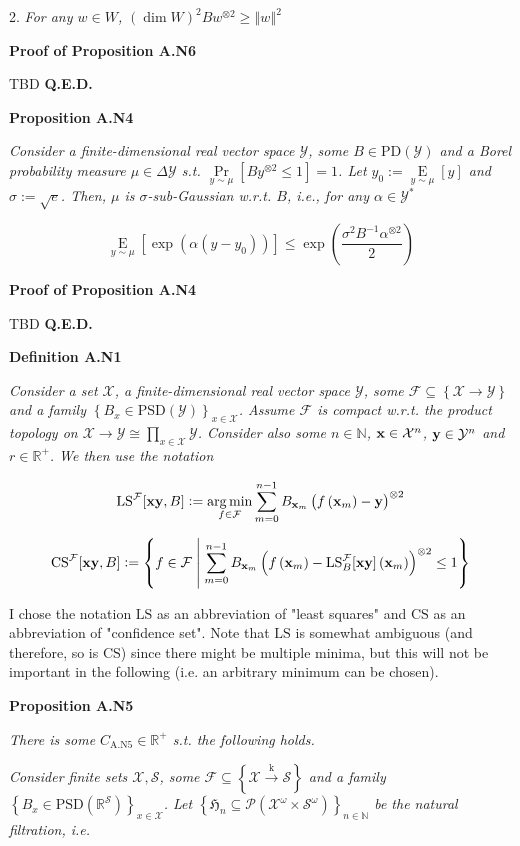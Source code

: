 \documentclass[a4paper]{article}
\newcommand{\Co}[1]{}
\newcommand{\AP}[1]{\left(#1\right)}
\newcommand{\AB}[1]{\left[#1\right]}
\newcommand{\AC}[1]{\left\{#1\right\}}
\newcommand{\ACM}[2]{\left\{#1\;\middle\vert\;#2\right\}}
\newcommand{\Pa}[2]{\underset{#1}{\operatorname{Pr}}\AB{#2}}
\newcommand{\Ea}[2]{\underset{#1}{\operatorname{E}}\AB{#2}}
\newcommand{\PS}[1]{\mathcal{P}\AP{#1}}
\newcommand{\Argmin}[1]{\underset{#1}{\operatorname{arg\,min}}\,}
\newcommand{\Nats}{\mathbb{N}}
\newcommand{\Reals}{\mathbb{R}}
\newcommand{\PD}{\mathrm{PD}}
\newcommand{\PSD}{\mathrm{PSD}}
\newcommand{\Norm}[1]{\left\Vert #1 \right\Vert}
\newcommand{\K}{\xrightarrow{\mathrm{k}}}
\newcommand{\B}{B}
\newcommand{\X}{\mathcal{X}}
\newcommand{\Y}{\mathcal{Y}}
\newcommand{\F}{\mathcal{F}}
\newcommand{\St}{\mathcal{S}}
\newcommand{\LS}{\mathrm{LS}}
\newcommand{\CS}{\mathrm{CS}}
\begin{document}
2. \textit{For any $w\in W$, $\AP{\dim{W}}^2 \B w^{\otimes 2}\geq \Norm{w}^2$}\Co{i}

\textbf{Proof of Proposition A.N6}\Co{b}

TBD \textbf{Q.E.D.}\Co{b}

\textbf{Proposition A.N4}\Co{b}

\textit{Consider a finite-dimensional real vector space $\Y$, some $\B \in\PD(\Y)$ and a Borel probability measure $\mu\in\Delta\Y$ s.t. $\Pa{y\sim\mu}{\B y^{\otimes 2} \leq 1} = 1$. Let $y_0:=\Ea{y\sim\mu}{y}$ and $\sigma:=\sqrt{e}$. Then, $\mu$ is $\sigma$-sub-Gaussian w.r.t. $\B $, i.e., for any $\alpha\in\Y^*$}\Co{i}

$$\Ea{y\sim\mu}{\exp\AP{\alpha\AP{y-y_0}}} \leq \exp\AP{\frac{\sigma^2\B ^{-1}\alpha^{\otimes 2}}{2}}$$

\textbf{Proof of Proposition A.N4}\Co{b}

TBD \textbf{Q.E.D.}\Co{b}

\textbf{Definition A.N1}\Co{b}

\textit{Consider a set $\X$, a finite-dimensional real vector space $\Y$, some $\F\subseteq\AC{\X\rightarrow\Y}$ and a family $\AC{\B _x\in\PSD(\Y)}_{x\in\X}$. Assume $\F$ is compact w.r.t. the product topology on $\X\rightarrow\Y\cong\prod_{x\in\X}\Y$. Consider also some $n\in\Nats$, $\bold{x}\in\X^n$, $\bold{y}\in\Y^n$ and $r\in\Reals^+$. We then use the notation}\Co{i}

$$\LS^{\F}[\bold{xy},\B]:=\Argmin{f\in\F}{\sum_{m=0}^{n-1}\B _{\bold{x}_m}\AP{f\AP{\bold{x}_m}-\bold{y} }^{\otimes2}}$$

$$\CS^{\F}[\bold{xy},B]:=\ACM{f\in\F}{\sum_{m=0}^{n-1}\B _{\bold{x}_m}\AP{f\AP{\bold{x}_m}-\LS_\B ^\F[\bold{xy}]\AP{\bold{x}_m}}^{\otimes2}\leq 1}$$

I chose the notation $\LS$ as an abbreviation of "least squares" and $\CS$ as an abbreviation of "confidence set". Note that $\LS$ is somewhat ambiguous (and therefore, so is $\CS$) since there might be multiple minima, but this will not be important in the following (i.e. an arbitrary minimum can be chosen).

\textbf{Proposition A.N5}\Co{b}

\textit{There is some $C_{\mathrm{A.N5}}\in\Reals^+$ s.t. the following holds.}\Co{i}

\textit{Consider finite sets $\X,\St$, some $\F\subseteq\AC{\X\K\St}$ and a family $\AC{\B _x\in\PSD\AP{\Reals^\St}}_{x\in\X}$. Let $\AC{\mathfrak{H}_n\subseteq\PS{\X^\omega\times\St^\omega}}_{n\in\Nats}$ be the natural filtration, i.e.}\Co{i}
\end{document}
